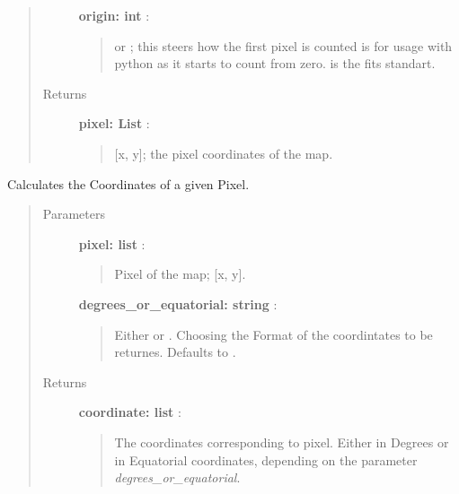 \documentclass[a4paper,10pt,english]{sphinxmanual}
\begin{document}
\begin{fulllineitems}
\begin{fulllineitems}
\begin{quote}
\begin{description}
\textbf{origin: int} :
\begin{quote}

 or ; this steers how the first pixel is counted
 is for usage with python as it starts to count from zero.
 is the fits standart.
\end{quote}

\item[{Returns }] \leavevmode
\textbf{pixel: List} :
\begin{quote}

{[}x, y{]}; the pixel coordinates of the map.
\end{quote}

\end{description}\end{quote}

\end{fulllineitems}


\begin{fulllineitems}
\label{maps:astrolyze.maps.fits.FitsMap.pix2sky}
Calculates the Coordinates of a given Pixel.
\begin{quote}\begin{description}
\item[{Parameters }] \leavevmode
\textbf{pixel: list} :
\begin{quote}

Pixel of the map; {[}x, y{]}.
\end{quote}

\textbf{degrees\_or\_equatorial: string} :
\begin{quote}

Either  or . Choosing the
Format of the coordintates to be returnes.
Defaults to .
\end{quote}

\item[{Returns }] \leavevmode
\textbf{coordinate: list} :
\begin{quote}

The coordinates corresponding to pixel. Either in Degrees or in
Equatorial coordinates, depending on the parameter
\emph{degrees\_or\_equatorial}.
\end{quote}

\end{description}\end{quote}


\end{fulllineitems}
\end{fulllineitems}
\end{document}
